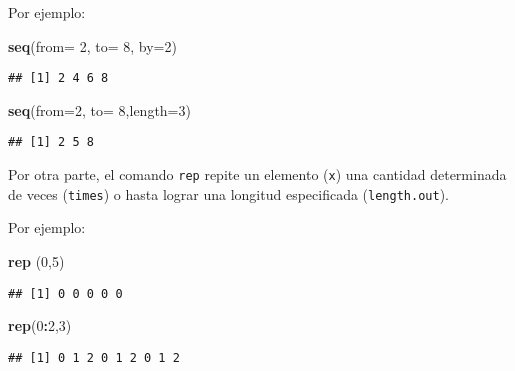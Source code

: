 \documentclass[]{book}
\newenvironment{Shaded}{\begin{snugshade}}{\end{snugshade}}
\newcommand{\DataTypeTok}[1]{\textcolor[rgb]{0.13,0.29,0.53}{#1}}
\newcommand{\DecValTok}[1]{\textcolor[rgb]{0.00,0.00,0.81}{#1}}
\newcommand{\KeywordTok}[1]{\textcolor[rgb]{0.13,0.29,0.53}{\textbf{#1}}}
\newcommand{\NormalTok}[1]{#1}
\newcommand{\OperatorTok}[1]{\textcolor[rgb]{0.81,0.36,0.00}{\textbf{#1}}}
\begin{document}
Por ejemplo:

\begin{Shaded}
\begin{Highlighting}[]
\KeywordTok{seq}\NormalTok{(}\DataTypeTok{from=} \DecValTok{2}\NormalTok{, }\DataTypeTok{to=} \DecValTok{8}\NormalTok{, }\DataTypeTok{by=}\DecValTok{2}\NormalTok{)}
\end{Highlighting}
\end{Shaded}

\begin{verbatim}
## [1] 2 4 6 8
\end{verbatim}

\begin{Shaded}
\begin{Highlighting}[]
\KeywordTok{seq}\NormalTok{(}\DataTypeTok{from=}\DecValTok{2}\NormalTok{, }\DataTypeTok{to=} \DecValTok{8}\NormalTok{,}\DataTypeTok{length=}\DecValTok{3}\NormalTok{)}
\end{Highlighting}
\end{Shaded}

\begin{verbatim}
## [1] 2 5 8
\end{verbatim}

Por otra parte, el comando \texttt{rep} repite un elemento (\texttt{x}) una cantidad determinada de veces (\texttt{times}) o hasta lograr una longitud especificada (\texttt{length.out}).

Por ejemplo:

\begin{Shaded}
\begin{Highlighting}[]
\KeywordTok{rep}\NormalTok{ (}\DecValTok{0}\NormalTok{,}\DecValTok{5}\NormalTok{)}
\end{Highlighting}
\end{Shaded}

\begin{verbatim}
## [1] 0 0 0 0 0
\end{verbatim}

\begin{Shaded}
\begin{Highlighting}[]
\KeywordTok{rep}\NormalTok{(}\DecValTok{0}\OperatorTok{:}\DecValTok{2}\NormalTok{,}\DecValTok{3}\NormalTok{)}
\end{Highlighting}
\end{Shaded}

\begin{verbatim}
## [1] 0 1 2 0 1 2 0 1 2
\end{verbatim}
\end{document}
